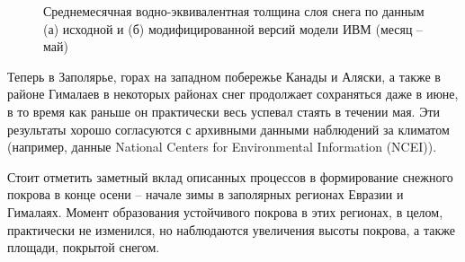 \documentclass[a4paper, fontsize=14pt]{scrartcl}
\begin{document}
\begin{figure}[h]
    \begin{minipage}[h]{0.99\linewidth}
    \end{minipage}
    \begin{minipage}[h]{0.99\linewidth}
    \end{minipage}
    \caption{Среднемесячная водно-эквивалентная толщина слоя снега по данным (а) исходной и (б) модифицированной версий модели ИВМ (месяц -- май) }
    \label{fig:image}
\end{figure}

Теперь в Заполярье, горах на западном побережье Канады и Аляски, а также в районе Гималаев в некоторых районах снег продолжает сохраняться даже в июне, в то время как раньше он практически весь успевал стаять в течении мая. Эти результаты хорошо согласуются с архивными данными наблюдений за климатом (например, данные National Centers for Environmental Information (NCEI)). 

Стоит отметить заметный вклад описанных процессов в формирование снежного покрова в конце осени -- начале зимы в заполярных регионах Евразии и Гималаях. Момент образования устойчивого покрова в этих регионах, в целом, практически не изменился, но наблюдаются увеличения высоты покрова, а также площади, покрытой снегом.
\end{document}
